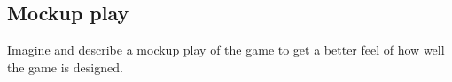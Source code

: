 

\subsection{Mockup play}

Imagine and describe a mockup play of the game to get a better feel of how well the game is designed.